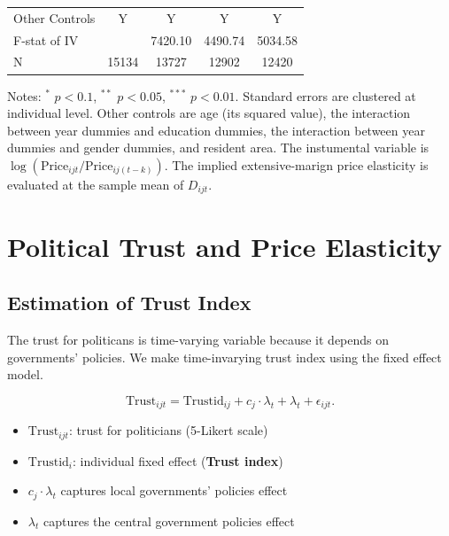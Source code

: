 \documentclass[ review  , 3p ]{elsarticle}
\providecommand{\tightlist}{%
  \setlength{\itemsep}{0pt}\setlength{\parskip}{0pt}}
\begin{document}
\begin{table}
\begin{threeparttable}
\begin{tabular}[t]{lcccc}
  \hspace{1em}Other Controls & Y & Y & Y & Y\\
  \hspace{1em}F-stat of IV &  & 7420.10 & 4490.74 & 5034.58\\
  \hspace{1em}N & 15134 & 13727 & 12902 & 12420\\
  \bottomrule
  \end{tabular}
  \begin{tablenotes}
  \item Notes: $^{*}$ $p < 0.1$, $^{**}$ $p < 0.05$, $^{***}$ $p < 0.01$. Standard errors are clustered at individual level. Other controls are age (its squared value), the interaction between year dummies and education dummies, the interaction between year dummies and gender dummies, and resident area. The instumental variable is $\log(\text{Price}_{ijt}/\text{Price}_{ij(t-k)})$. The implied extensive-marign price elasticity is evaluated at the sample mean of $D_{ijt}$.
  \end{tablenotes}
  \end{threeparttable}
  \end{table}

  \hypertarget{political-trust-and-price-elasticity}{%
  \section{Political Trust and Price Elasticity}\label{political-trust-and-price-elasticity}}

  \hypertarget{estimation-of-trust-index}{%
  \subsection{Estimation of Trust Index}\label{estimation-of-trust-index}}

  The trust for politicans is time-varying variable because it depends on governments' policies.
  We make time-invarying trust index using the fixed effect model.

  \[
      \text{Trust}_{ijt} = \text{Trustid}_{ij} + c_j \cdot \lambda_t + \lambda_t + \epsilon_{ijt}.
  \]

  \begin{itemize}
  \tightlist
  \item
    \(\text{Trust}_{ijt}\): trust for politicians (5-Likert scale)
  \item
    \(\text{Trustid}_i\): individual fixed effect (\textbf{Trust index})
  \item
    \(c_j \cdot \lambda_t\) captures local governments' policies effect
  \item
    \(\lambda_t\) captures the central government policies effect
  \end{itemize}
\end{document}
